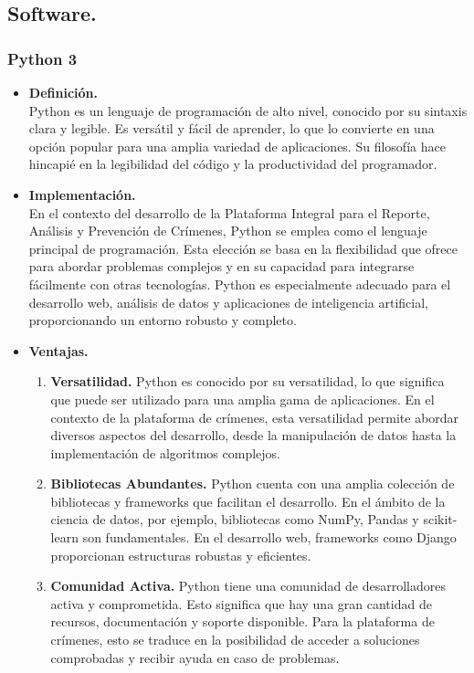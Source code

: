 \documentclass{article}
\begin{document}
    \subsection{Software.}
        \subsubsection{Python 3}
        \begin{itemize}
            \item \textbf{Definición.}\\
            Python es un lenguaje de programación de alto nivel, conocido por su sintaxis clara y legible. Es versátil y fácil de aprender, lo que lo convierte en una opción popular para una amplia variedad de aplicaciones. Su filosofía hace hincapié en la legibilidad del código y la productividad del programador.
            \item \textbf{Implementación.}\\
            En el contexto del desarrollo de la Plataforma Integral para el Reporte, Análisis y Prevención de Crímenes, Python se emplea como el lenguaje principal de programación. Esta elección se basa en la flexibilidad que ofrece para abordar problemas complejos y en su capacidad para integrarse fácilmente con otras tecnologías. Python es especialmente adecuado para el desarrollo web, análisis de datos y aplicaciones de inteligencia artificial, proporcionando un entorno robusto y completo.
            \item \textbf{Ventajas.}\\
                \begin{enumerate}
                    \item \textbf{Versatilidad.} Python es conocido por su versatilidad, lo que significa que puede ser utilizado para una amplia gama de aplicaciones. En el contexto de la plataforma de crímenes, esta versatilidad permite abordar diversos aspectos del desarrollo, desde la manipulación de datos hasta la implementación de algoritmos complejos.

                    \item \textbf{Bibliotecas Abundantes.} Python cuenta con una amplia colección de bibliotecas y frameworks que facilitan el desarrollo. En el ámbito de la ciencia de datos, por ejemplo, bibliotecas como NumPy, Pandas y scikit-learn son fundamentales. En el desarrollo web, frameworks como Django proporcionan estructuras robustas y eficientes.

                    \item \textbf{Comunidad Activa.} Python tiene una comunidad de desarrolladores activa y comprometida. Esto significa que hay una gran cantidad de recursos, documentación y soporte disponible. Para la plataforma de crímenes, esto se traduce en la posibilidad de acceder a soluciones comprobadas y recibir ayuda en caso de problemas.


\end{enumerate}
\end{itemize}
\end{document}
